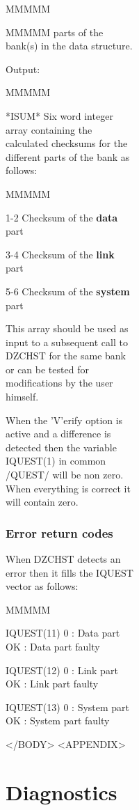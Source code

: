 \begin{figure}
\begin{figure}
\begin{figure}
\begin{figure}
\begin{DL}{MMMMM}
\begin{DL}{MMMMM}
parts of the bank(s) in the data structure.
\end{DL}
\item[Output:
]
\begin{DL}{MMMMM}
\item[*ISUM*
]Six word integer array containing the calculated checksums
for the different parts of the bank as follows:
\begin{DL}{MMMMM}
\item[1-2
]Checksum of the {\bf data} part
\item[3-4
]Checksum of the {\bf link} part
\item[5-6
]Checksum of the {\bf system} part
\end{DL}
\newline This array should be used as input to a subsequent call to DZCHST
for the same bank or can be tested for modifications by the
user himself.
\end{DL}
\end{DL}
\par
When the 'V'erify option is active and a difference is detected
then the variable IQUEST(1) in common /QUEST/
will be non zero. When everything is correct it will contain zero.
\subsection{Error return codes}
\par
When DZCHST detects an error then it fills the IQUEST vector as follows:
\begin{DL}{MMMMM}
\item[IQUEST(11)
]0 : Data part OK
 : Data part faulty
\item[IQUEST(12)
]0 : Link part OK
 : Link part faulty
\item[IQUEST(13)
]0 : System part OK
 : System part faulty
\end{DL}
</BODY>
<APPENDIX>
\chapter{Diagnostics}

\end{figure}
\end{figure}
\end{figure}
\end{figure}
